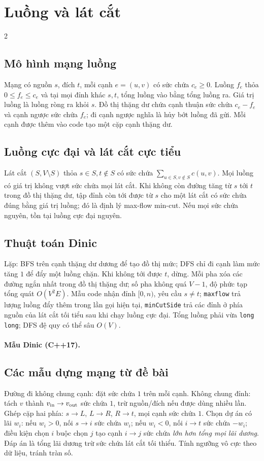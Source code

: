\section{Luồng và lát cắt}
\begingroup\small
\begin{multicols}{2}
\subsection{Mô hình mạng luồng}
Mạng có nguồn $s$, đích $t$, mỗi cạnh $e=(u,v)$ có sức chứa
$c_e\ge0$. Luồng $f_e$ thỏa $0\le f_e\le c_e$ và tại mọi đỉnh
khác $s,t$, tổng luồng vào bằng tổng luồng ra.
Giá trị luồng là luồng ròng ra khỏi $s$.
Đồ thị thặng dư chứa cạnh thuận sức chứa $c_e-f_e$ và cạnh
ngược sức chứa $f_e$; đi cạnh ngược nghĩa là hủy bớt luồng
đã gửi. Mỗi cạnh được thêm vào code tạo một cặp cạnh thặng dư.

\subsection{Luồng cực đại và lát cắt cực tiểu}
Lát cắt $(S,V\setminus S)$ thỏa $s\in S,t\notin S$ có sức chứa
$\sum_{u\in S,v\notin S}c(u,v)$. Mọi luồng có giá trị không
vượt sức chứa mọi lát cắt. Khi không còn đường tăng từ $s$
tới $t$ trong đồ thị thặng dư, tập đỉnh còn tới được từ $s$
cho một lát cắt có sức chứa đúng bằng giá trị luồng;
đó là định lý max-flow min-cut.
Nếu mọi sức chứa nguyên, tồn tại luồng cực đại nguyên.

\subsection{Thuật toán Dinic}
Lặp: BFS trên cạnh thặng dư dương để tạo đồ thị mức;
DFS chỉ đi cạnh làm mức tăng $1$ để đẩy một luồng chặn.
Khi không tới được $t$, dừng. Mỗi pha xóa các đường ngắn nhất
trong đồ thị thặng dư; số pha không quá $V-1$, độ phức tạp tổng
quát $O(V^2E)$. Mẫu code nhận đỉnh $[0,n)$, yêu cầu $s\ne t$;
\texttt{maxflow} trả lượng luồng đẩy thêm trong lần gọi hiện tại,
\texttt{minCutSide} trả các đỉnh ở phía nguồn của lát cắt tối tiểu
sau khi chạy luồng cực đại.
Tổng luồng phải vừa \texttt{long long}; DFS đệ quy có thể sâu $O(V)$.

\paragraph{Mẫu Dinic (C++17).}

\subsection{Các mẫu dựng mạng từ đề bài}
Đường đi không chung cạnh: đặt sức chứa $1$ trên mỗi cạnh.
Không chung đỉnh: tách $v$ thành $v_{\rm in}\to v_{\rm out}$
sức chứa $1$, trừ nguồn/đích nếu được dùng nhiều lần.
Ghép cặp hai phía: $s\to L$, $L\to R$, $R\to t$, mọi cạnh
sức chứa $1$. Chọn dự án có lãi $w_i$: nếu $w_i>0$, nối
$s\to i$ sức chứa $w_i$; nếu $w_i<0$, nối $i\to t$
sức chứa $-w_i$; điều kiện chọn $i$ buộc chọn $j$ tạo cạnh
$i\to j$ sức chứa \emph{lớn hơn tổng mọi lãi dương}.
Đáp án là tổng lãi dương trừ sức chứa lát cắt tối thiểu.
Tính ngưỡng vô cực theo dữ liệu, tránh tràn số.


\end{multicols}
